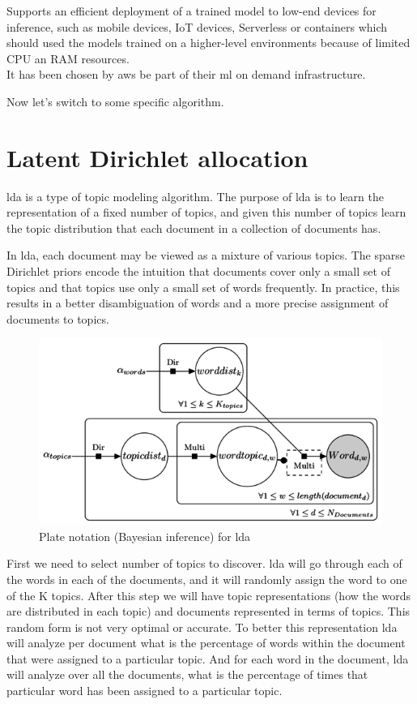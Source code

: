 \documentclass[thesis=M,english]{FITthesis}[2012/06/26]
\begin{document}
Supports an efficient deployment of a trained model to low-end devices for inference, such as mobile devices, IoT devices, Serverless or containers which should used the models trained on a higher-level environments because of limited CPU an RAM resources.\\

It has been chosen by \acrshort{aws} be part of their \acrshort{ml} on demand infrastructure.

Now let's switch to some specific algorithm.

\section{Latent Dirichlet allocation}

\acrshort{lda}\cite{ml_lda} is a type of topic modeling algorithm. The purpose of \acrshort{lda} is to learn the representation of a fixed number of topics, and given this number of topics learn the topic distribution that each document in a collection of documents has.

In \acrshort{lda}, each document may be viewed as a mixture of various topics. The sparse Dirichlet priors encode the intuition that documents cover only a small set of topics and that topics use only a small set of words frequently. In practice, this results in a better disambiguation of words and a more precise assignment of documents to topics. 

\begin{figure}[h!]\centering
	\includegraphics[width=1\textwidth]{pictures/ml_lda_scheme}
	\caption{Plate notation (Bayesian inference) for \acrshort{lda} \cite{ml_lda_exmplanation}}\label{fig:ml_lda_scheme}
\end{figure}

First we need to select number of topics to discover. \acrshort{lda} will go through each of the words in each of the documents, and it will randomly assign the word to one of the K topics. After this step we will have topic representations (how the words are distributed in each topic) and documents represented in terms of topics. This random form is not very optimal or accurate. To better this representation \acrshort{lda} will analyze per document what is the percentage of words within the document that were assigned to a particular topic. And for each word in the document, \acrshort{lda} will analyze over all the documents, what is the percentage of times that particular word has been assigned to a particular topic.
\end{document}
